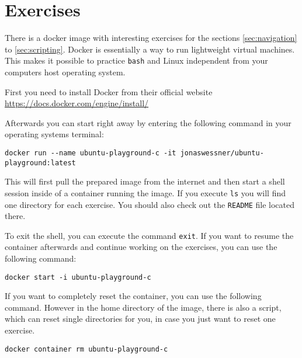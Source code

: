 \section{Exercises}

There is a docker image with interesting exercises for the sections \ref{sec:navigation} to \ref{sec:scripting}. Docker is essentially a way to run lightweight virtual machines. This makes it possible to practice \lstinline{bash} and Linux independent from your computers host operating system.

First you need to install Docker from their official website \url{https://docs.docker.com/engine/install/}

Afterwards you can start right away by entering the following command in your operating systems terminal:

\begin{lstlisting}
docker run --name ubuntu-playground-c -it jonaswessner/ubuntu-playground:latest
\end{lstlisting}

This will first pull the prepared image from the internet and then start a shell session inside of a container running the image. If you execute \lstinline{ls} you will find one directory for each exercise. You should also check out the \lstinline{README} file located there.

To exit the shell, you can execute the command \lstinline{exit}. If you want to resume the container afterwards and continue working on the exercises, you can use the following command:

\begin{lstlisting}
docker start -i ubuntu-playground-c
\end{lstlisting}


If you want to completely reset the container, you can use the following command. However in the home directory of the image, there is also a script, which can reset single directories for you, in case you just want to reset one exercise.

\begin{lstlisting}
docker container rm ubuntu-playground-c
\end{lstlisting}
